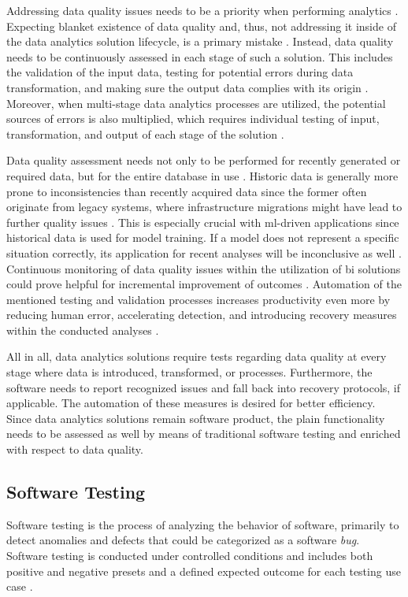 Addressing data quality issues needs to be a priority when performing analytics \cite{Freudiger2014}\cite{Veber2018}\cite{Redman2020}. Expecting blanket existence of data quality and, thus, not addressing it inside of the data analytics solution lifecycle, is a primary mistake \cite{Munawar2011}. Instead, data quality needs to be continuously assessed in each stage of such a solution. This includes the validation of the input data, testing for potential errors during data transformation, and making sure the output data complies with its origin \cite{Homayouni2018}\cite{Munawar2011}\cite{Redman2016}. Moreover, when multi-stage data analytics processes are utilized, the potential sources of errors is also multiplied, which requires individual testing of input, transformation, and output of each stage of the solution \cite{Homayouni2018}.

Data quality assessment needs not only to be performed for recently generated or required data, but for the entire database in use \cite{Redman2020}\cite{Freudiger2014}. Historic data is generally more prone to inconsistencies than recently acquired data since the former often originate from legacy systems, where infrastructure migrations might have lead to further quality issues \cite{Sneed2013}. This is especially crucial with \acs{ml}-driven applications since historical data is used for model training. If a model does not represent a specific situation correctly, its application for recent analyses will be inconclusive as well \cite{Redman2018}. Continuous monitoring of data quality issues within the utilization of \ac{bi} solutions could prove helpful for incremental improvement of outcomes \cite{Munawar2011}. Automation of the mentioned testing and validation processes increases productivity even more by reducing human error, accelerating detection, and introducing recovery measures within the conducted analyses \cite{Homayouni2018}\cite{Veber2018}.

All in all, data analytics solutions require tests regarding data quality at every stage where data is introduced, transformed, or processes. Furthermore, the software needs to report recognized issues and fall back into recovery protocols, if applicable. The automation of these measures is desired for better efficiency. Since data analytics solutions remain software product, the plain functionality needs to be assessed as well by means of traditional software testing and enriched with respect to data quality. 

\subsection{Software Testing}
Software testing is the process of analyzing the behavior of software, primarily to detect anomalies and defects that could be categorized as a software \textit{bug}. Software testing is conducted under controlled conditions and includes both positive and negative presets and a defined expected outcome for each testing use case \cite{Mahfuz2016}.

